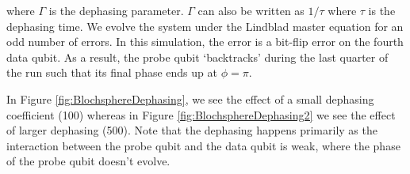 where $\Gamma$ is the dephasing parameter. $\Gamma$ can also be written as $1/\tau$ where $\tau$ is the dephasing time. We evolve the system under the Lindblad master equation for an odd number of errors. In this simulation, the error is a bit-flip error on the fourth data qubit.  As a result, the probe qubit `backtracks'  during the last quarter of the run such that its final phase ends up at $\phi = \pi$. 

In Figure \ref{fig:BlochsphereDephasing}, we see the effect of a small dephasing coefficient (100) whereas in Figure \ref{fig:BlochsphereDephasing2} we see the effect of larger dephasing (500). Note that the dephasing happens primarily as the interaction between the probe qubit and the data qubit is weak, where the phase of the probe qubit doesn't evolve. 


\begin{figure}[H]
	\caption[oddeven]{}
	\label{FIG:deph}
\end{figure}

